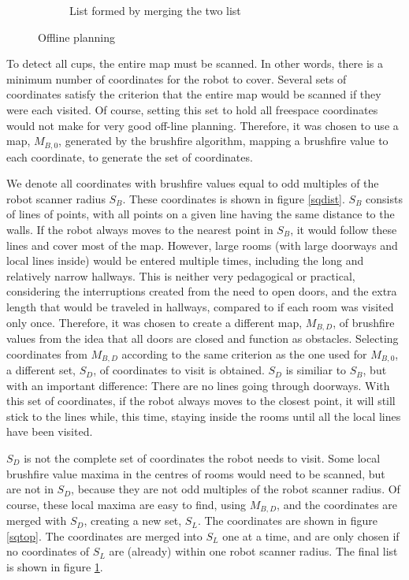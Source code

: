 \begin{figure}[ht]
\begin{subfigure}[t]{0.3\textwidth}
    \caption{List formed by merging the two list}
    \label{sqlist}
  \end{subfigure}
\caption{Offline planning}
\label{offline_steps}
\end{figure}

To detect all cups, the entire map must be scanned.
In other words, there is a minimum number of coordinates for the robot to cover.
Several sets of coordinates satisfy the criterion that the entire map would be scanned if they were each visited.
Of course, setting this set to hold all freespace coordinates would not make for very good off-line planning.
Therefore, it was chosen to use a map, \(M_{B,0}\), generated by the brushfire algorithm,
mapping a brushfire value to each coordinate, to generate the set of coordinates.

We denote all coordinates with brushfire values equal to odd multiples of the robot scanner radius \(S_{B}\).
These coordinates is shown in figure \ref{sqdist}.
\(S_{B}\) consists of lines of points, with all points on a given line having the same distance to the walls.
If the robot always moves to the nearest point in \(S_{B}\),
it would follow these lines and cover most of the map.
However, large rooms (with large doorways and local lines inside) would be entered multiple times,
including the long and relatively narrow hallways.
This is neither very pedagogical or practical, considering the interruptions created
from the need to open doors, and the extra length that would be traveled
in hallways, compared to if each room was visited only once.
Therefore, it was chosen to create a different map, \(M_{B,D}\), of brushfire values from the idea
that all doors are closed and function as obstacles.
Selecting coordinates from \(M_{B,D}\) according to the same criterion as the one used for \(M_{B,0}\),
a different set, \(S_{D}\), of coordinates to visit is obtained.
\(S_{D}\) is similiar to \(S_{B}\), but with an important difference:
There are no lines going through doorways.
With this set of coordinates, if the robot always moves to the closest point,
it will still stick to the lines while, this time, staying inside the rooms until all the local lines
have been visited.

\(S_{D}\) is not the complete set of coordinates the robot needs to visit.
Some local brushfire value maxima in the centres of rooms would need to be scanned,
but are not in \(S_{D}\), because they are not odd multiples of the robot scanner radius.
Of course, these local maxima are easy to find, using \(M_{B,D}\), and the coordinates
are merged with \(S_{D}\), creating a new set, \(S_{L}\).
The coordinates are shown in figure \ref{sqtop}.
The coordinates are merged into \(S_{L}\) one at a time, and are only chosen if no coordinates
of \(S_{L}\) are (already) within one robot scanner radius.
The final list is shown in figure \ref{sqlist}.

